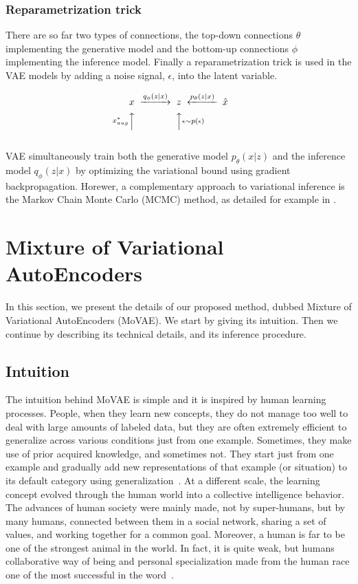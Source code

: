 \documentclass[sigconf,authorversion=true]{aamas}  %
\begin{document}
\subsubsection{Reparametrization trick}
 There are so far two types of connections, the top-down connections $\theta$ implementing the generative model and the bottom-up connections $\phi$ implementing the inference model. Finally a  reparametrization trick is used in the VAE models by adding a noise signal, $\epsilon$, into the latent variable.

\begin{equation*}
\begin{CD}
x @>{q_{\phi}(z|x)}>> z@<{p_{\theta}(z|x)}<< \hat{x}\\
@A{x_{aug}^*}AA @AA{\epsilon\sim p(\epsilon)}A@.\\
@. @.\\
\end{CD}
\end{equation*}%
VAE simultaneously train both the generative model $p_{\theta}(x|z)$ and the inference model $q_{\phi}(z|x)$  by optimizing the variational bound using gradient backpropagation. Horewer, a complementary approach to variational inference is the Markov Chain Monte Carlo (MCMC) method, as detailed for example in \cite{icml2015_salimans15}.

\section{Mixture of Variational AutoEncoders}
In this section, we present the details of our proposed method, dubbed Mixture of Variational AutoEncoders (MoVAE). We start by giving its intuition. Then we continue by describing its technical details, and its inference procedure.
\subsection{Intuition}
The intuition behind MoVAE is simple and it is inspired by human learning processes. People, when they learn new concepts, they do not manage too well to deal with large amounts of labeled data, but they are often extremely efficient to generalize across various conditions just from one example. Sometimes, they make use of prior acquired knowledge, and sometimes not. They start just from one example and gradually add new representations of that example (or situation) to its default category using generalization~\cite{Generalizationhumans}. At a different scale, the learning concept evolved through the human world into a collective intelligence behavior. The advances of human society %
were mainly made, not by super-humans, but by many humans, connected between them in a social network, sharing a set of values, and working together for a common goal. Moreover, a human is far to be one of the strongest animal in the world. In fact, it is quite weak, but humans collaborative way of being and personal specialization made from the human race one of the most successful in the word~\cite{humankind}.
\end{document}

